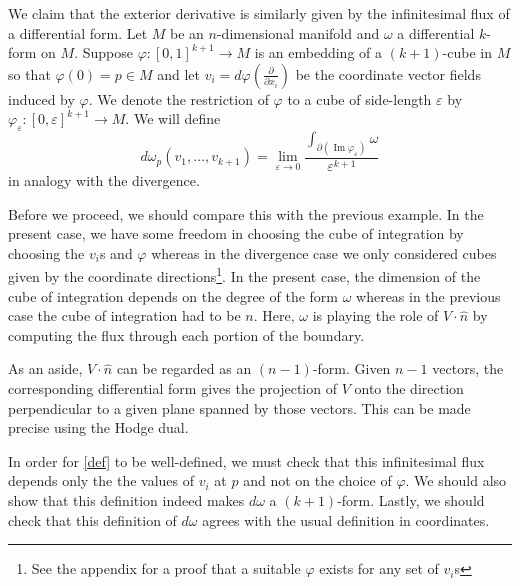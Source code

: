\documentclass[12pt]{article}
\renewcommand{\Im}{\operatorname{Im}}
\begin{document}
We claim that the exterior derivative is similarly given by the infinitesimal flux of a differential form. Let $M$ be an $n$-dimensional manifold and $\omega$ a differential $k$-form on $M$. Suppose $\varphi: [0, 1]^{k+1} \to M$ is an embedding of a $(k+1)$-cube in $M$ so that $\varphi(0) = p \in M$ and let $v_i = d\varphi \left (\frac{\partial}{\partial x_i} \right)$ be the coordinate vector fields induced by $\varphi$. We denote the restriction of $\varphi$ to a cube of side-length $\varepsilon$ by $\varphi_\varepsilon: [0, \varepsilon]^{k+1} \to M$. We will define
\begin{dmath}
d\omega_p (v_1, \ldots, v_{k+1}) =  \lim_{\varepsilon \to 0} \frac{\int _{\partial (\Im \varphi_\varepsilon )} \omega}{\varepsilon^{k+1}} \label{def}
\end{dmath}
in analogy with the divergence.

Before we proceed, we should compare this with the previous example. In the present case, we have some freedom in choosing the cube of integration by choosing the $v_i$s and $\varphi$ whereas in the divergence case we only considered cubes given by the coordinate directions\footnote{See the appendix for a proof that a suitable $\varphi$ exists for any set of $v_i$s}. In the present case, the dimension of the cube of integration depends on the degree of the form $\omega$ whereas in the previous case the cube of integration had to be $n$. Here, $\omega$ is playing the role of $V \cdot \hat n$ by computing the flux through each portion of the boundary.

As an aside, $V \cdot \hat n$ can be regarded as an $(n-1)$-form. Given $n-1$ vectors, the corresponding differential form gives the projection of $V$ onto the direction perpendicular to a given plane spanned by those vectors. This can be made precise using the Hodge dual.


In order for \eqref{def} to be well-defined, we must check that this infinitesimal flux depends only the the values of $v_i$ at $p$ and not on the choice of $\varphi$. We should also show that this definition indeed makes $d \omega$ a $(k+1)$-form. Lastly, we should check that this definition of $d\omega$ agrees with the usual definition in coordinates.
\end{document}
